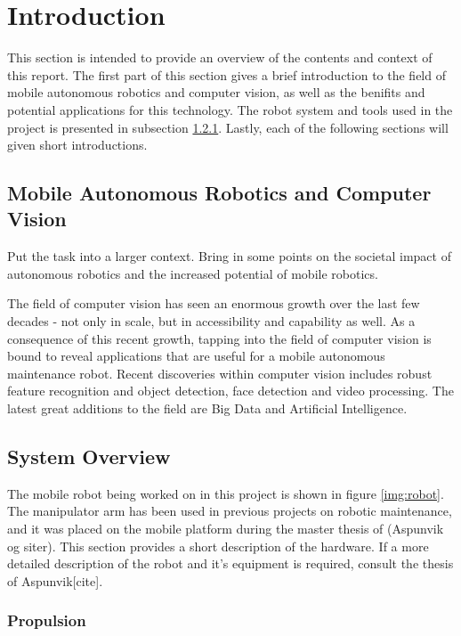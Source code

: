 \chapter{Introduction}
\label{chp:introduction} 

This section is intended to provide an overview of the contents and context of this report. The first part of this section gives a brief introduction to the field of mobile autonomous robotics and computer vision, as well as the benifits and potential applications for this technology. The robot system and tools used in the project is presented in subsection \ref{}. Lastly, each of the following sections will given short introductions.




\section{Mobile Autonomous Robotics and Computer Vision}

Put the task into a larger context. Bring in some points on the societal impact of autonomous robotics and the increased potential of mobile robotics.  

The field of computer vision has seen an enormous growth over the last few decades - not only in scale, but in accessibility and capability as well. As a consequence of this recent growth, tapping into the field of computer vision is bound to reveal applications that are useful for a mobile autonomous maintenance robot. Recent discoveries within computer vision includes robust feature recognition and object detection, face detection and video processing. The latest great additions to the field are Big Data and Artificial Intelligence.

\section{System Overview}

The mobile robot being worked on in this project is shown in figure \ref{img:robot}. The manipulator arm  has been used in previous projects on robotic maintenance, and it was placed on the mobile platform during the master thesis of (Aspunvik og siter). This section provides a short description of the hardware. If a more detailed description of the robot and it's equipment is required, consult the thesis of Aspunvik[cite]. 

\subsection{Propulsion}


